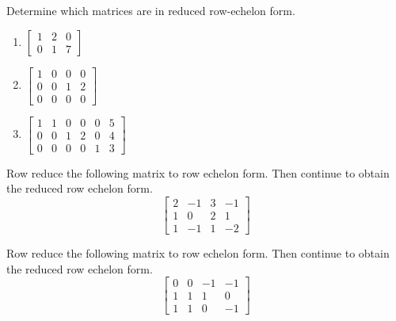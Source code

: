 \documentclass{ximera}
\begin{document}
\begin{problem}\label{prb:2.17} Determine which matrices are in reduced row-echelon form.

\begin{enumerate}
\item $\left[
\begin{array}{rrr}
1 & 2 & 0 \\
0 & 1 & 7
\end{array}
\right] $  

\item $\left[
\begin{array}{rrrr}
1 & 0 & 0 & 0 \\
0 & 0 & 1 & 2 \\
0 & 0 & 0 & 0
\end{array}
\right] $ 

\item $\left[
\begin{array}{rrrrrr}
1 & 1 & 0 & 0 & 0 & 5 \\
0 & 0 & 1 & 2 & 0 & 4 \\
0 & 0 & 0 & 0 & 1 & 3
\end{array}
\right] $ 

\end{enumerate}
\end{problem}

\begin{problem}\label{prb:2.18} Row reduce the following matrix to row echelon form. Then continue to obtain the reduced row echelon form.
\begin{equation*}
\left[
\begin{array}{rrrr}
2 & -1 & 3 & -1 \\
1 & 0 & 2 & 1 \\
1 & -1 & 1 & -2
\end{array}
\right]
\end{equation*}
\end{problem}

\begin{problem}\label{prb:2.19} Row reduce the following matrix to row echelon form. Then continue to obtain the reduced row echelon form.
\begin{equation*}
\left[
\begin{array}{rrrr}
0 & 0 & -1 & -1 \\
1 & 1 & 1 & 0 \\
1 & 1 & 0 & -1
\end{array}
\right]
\end{equation*}
\end{problem}
\end{document}
